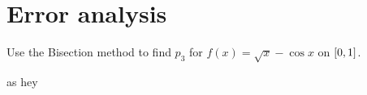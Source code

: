 \documentclass[../../Assignments.tex]{subfiles}
\begin{document}
\chapter{Error analysis}

\begin{exercise}
    Use the Bisection method to find \(p_3\) for \(f(x) = \sqrt{x} - \cos x\) on \(\interval{0}{1}\).
\end{exercise}

\begin{solution}
    as hey 
\end{solution}
\end{document}
